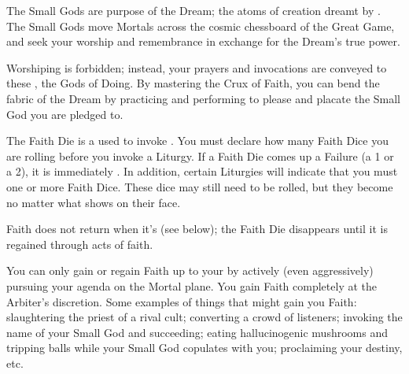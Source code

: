 

The Small Gods are purpose of the Dream; the atoms of creation dreamt by \TheAuthority. The Small Gods move Mortals across the cosmic chessboard of the Great Game, and seek your worship and remembrance in exchange for the Dream's true power. 

Worshiping \TheAuthority is forbidden; instead, your prayers and invocations are conveyed to these , the Gods of Doing.  By mastering the Crux of Faith, you can bend the fabric of the Dream by practicing  and performing  to please and placate the Small God you are pledged to.





The Faith Die is a  used to invoke . You must declare how many Faith Dice you are rolling before you invoke a Liturgy. If a Faith Die comes up a Failure (a 1 or a 2), it is immediately .  In addition, certain Liturgies will indicate that you must  one or more Faith Dice. These dice may still need to be rolled, but they become  no matter what shows on their face.

Faith does not return when it's  (see  below); the Faith Die disappears until it is regained through acts of faith.  

\cbreak


    You can only gain or regain Faith up to your \MAX by actively (even aggressively) pursuing your  agenda on the Mortal plane.  You gain Faith completely at the Arbiter's discretion.  Some examples of things that might gain you Faith: slaughtering the priest of a rival cult; converting a crowd of listeners; invoking the name of your Small God and succeeding; eating hallucinogenic mushrooms and tripping balls while your Small God copulates with you; proclaiming your destiny, etc.

